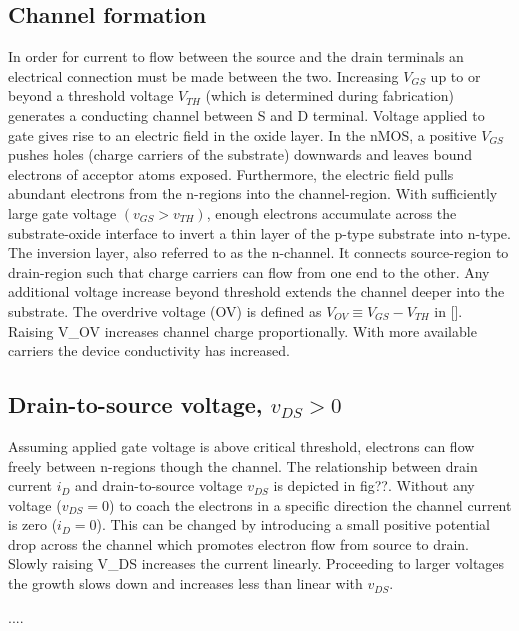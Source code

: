 \subsection{Channel formation}
In order for current to flow between the source and the drain terminals an electrical connection must be made between the two. Increasing $V_{GS}$ up to or beyond a threshold voltage $V_{TH}$ (which is determined during fabrication) generates a conducting channel between S and D terminal. Voltage applied to gate gives rise to an electric field in the oxide layer. In the nMOS, a positive $V_{GS}$ pushes holes (charge carriers of the substrate) downwards and leaves bound electrons of acceptor atoms exposed. Furthermore, the electric field pulls abundant electrons from the n-regions into the channel-region.  With sufficiently large gate voltage $(v_{{GS}}>v_{TH})$, enough electrons accumulate across the substrate-oxide interface to invert a thin layer of the p-type substrate into n-type. The inversion layer, also referred to as the n-channel. It connects source-region to drain-region such that charge carriers can flow from one end to the other.
Any additional voltage increase beyond threshold extends the channel deeper into the substrate. The overdrive voltage (OV) is defined as $V_{OV}≡V_{GS}-V_{TH}$ in []. Raising V_OV increases channel charge proportionally. With more available carriers the device conductivity has increased.


\subsection{Drain-to-source voltage, $v_{DS}>0$}
Assuming applied gate voltage is above critical threshold, electrons can flow freely between n-regions though the channel. The relationship between drain current $i_D$ and drain-to-source voltage $v_{DS}$ is depicted in fig??. Without any voltage ($v_{DS}=0$) to coach the electrons in a specific direction the channel current is zero ($i_D=0$). This can be changed by introducing a small positive potential drop across the channel which promotes electron flow from source to drain. Slowly raising V_DS increases the current linearly. Proceeding to larger voltages the growth slows down and increases less than linear with $v_{DS}$.

....
